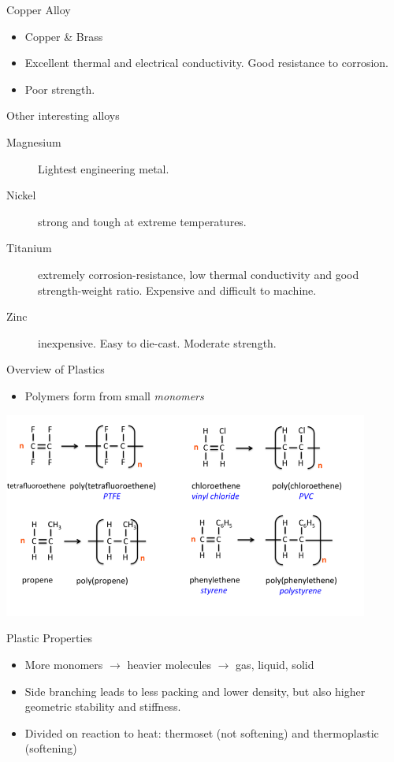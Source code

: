 \documentclass[10pt, svgnames]{beamer}
\begin{document}
\begin{frame}[label={sec:org2602db6}]{Copper Alloy}
\begin{itemize}
\item Copper \& Brass
\item Excellent thermal and electrical conductivity. Good resistance to corrosion.
\item Poor strength.
\end{itemize}
\end{frame}

\begin{frame}[label={sec:org8aa5375}]{Other interesting alloys}
\begin{description}
\item[{Magnesium}] Lightest engineering metal.
\item[{Nickel}] strong and tough at extreme temperatures.
\item[{Titanium}] extremely corrosion-resistance, low thermal conductivity and good strength-weight ratio. Expensive and difficult to machine.
\item[{Zinc}] inexpensive. Easy to die-cast. Moderate strength.
\end{description}
\end{frame}


\begin{frame}[label={sec:org48ef63a}]{Overview of Plastics}
\begin{itemize}
\item Polymers form from small \emph{monomers}
\end{itemize}

\centering
\includegraphics[width=0.9\textwidth]{pictures/polymer}
\end{frame}


\begin{frame}[label={sec:org6b76db4}]{Plastic Properties}
\begin{itemize}
\item More monomers \(\rightarrow\) heavier molecules \(\rightarrow\) gas, liquid, solid
\item Side branching leads to less packing and lower density, but also higher geometric stability and stiffness.
\item Divided on reaction to heat: thermoset (not softening) and thermoplastic (softening)
\end{itemize}
\end{frame}
\end{document}
